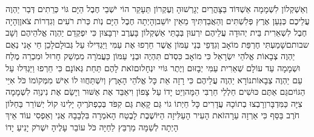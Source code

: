 \documentclass[../main/main.tex]{subfiles}
\begin{document}
\begin{multicols}{\ncols}
וְאַשְׁקְלוֹן לִשְׁמָמָה אַשְׁדּוֹד בַּצָּהֳרַיִם יְגָרְשׁוּהָ וְעֶקְרוֹן תֵּעָקֵר \ClosedSection{}הוֹי יֹשְׁבֵי חֶבֶל הַיָּם גּוֹי כְּרֵתִים דְּבַר יַהְוֶה עֲלֵיכֶם כְּנַעַן אֶרֶץ פְּלִשְׁתִּים וְהַאֲבַדְתִּיךְ מֵאֵין יוֹשֵׁב\PreVerseSpace{}וְהָיְתָה חֶבֶל הַיָּם נְוֺת כְּרֹת רֹעִים וְגִדְרוֹת צֹאן\PreVerseSpace{}וְהָיָה חֶבֶל לִשְׁאֵרִית בֵּית יְהוּדָה עֲלֵיהֶם יִרְעוּן בְּבָתֵּי אַשְׁקְלוֹן בָּעֶרֶב יִרְבָּצוּן כִּי יִפְקְדֵם יַהְוֶה אֱלֹהֵיהֶם וְשָׁב שבותם\PreVerseSpace{}שָׁמַעְתִּי חֶרְפַּת מוֹאָב וְגִדֻּפֵי בְּנֵי עַמּוֹן אֲשֶׁר חֵרְפוּ אֶת עַמִּי וַיַּגְדִּילוּ עַל גְּבוּלָם\PreVerseSpace{}לָכֵן חַי אָנִי נְאֻם יַהְוֶה צְבָאוֹת אֱלֹהֵי יִשְׂרָאֵל כִּי מוֹאָב כִּסְדֹם תִּהְיֶה וּבְנֵי עַמּוֹן כַּעֲמֹרָה מִמְשַׁק חָרוּל וּמִכְרֵה מֶלַח וּשְׁמָמָה עַד עוֹלָם שְׁאֵרִית עַמִּי יְבָזּוּם וְיֶתֶר גּוֹיִי\SubEnd{} יִנְחָלוּם\PreVerseSpace{}זֹאת לָהֶם תַּחַת גְּאוֹנָם כִּי חֵרְפוּ וַיַּגְדִּלוּ עַל עַם יַהְוֶה צְבָאוֹת\PreVerseSpace{}נוֹרָא יַהְוֶה עֲלֵיהֶם כִּי רָזָה אֵת כָּל אֱלֹהֵי הָאָרֶץ וְיִשְׁתַּחֲווּ לוֹ אִישׁ מִמְּקוֹמוֹ כֹּל אִיֵּי הַגּוֹיִם\PreVerseSpace{}גַּם אַתֶּם כּוּשִׁים חַלְלֵי חַרְבִּי הֵמָּה\PreVerseSpace{}וְיֵט יָדוֹ עַל צָפוֹן וִיאַבֵּד אֶת אַשּׁוּר וְיָשֵׂם אֶת נִינְוֵה לִשְׁמָמָה צִיָּה כַּמִּדְבָּר\PreVerseSpace{}וְרָבְצוּ בְתוֹכָהּ עֲדָרִים כָּל חַיְתוֹ גוֹי גַּם קָאַת גַּם קִפֹּד בְּכַפְתֹּרֶיהָ יָלִינוּ קוֹל יְשׁוֹרֵר בַּחַלּוֹן חֹרֶב בַּסַּף כִּי אַרְזָה עֵרָה\PreVerseSpace{}זֹאת הָעִיר הָעַלִּיזָה הַיּוֹשֶׁבֶת לָבֶטַח הָאֹמְרָה בִּלְבָבָהּ אֲנִי וְאַפְסִי עוֹד אֵיךְ הָיְתָה לְשַׁמָּה מַרְבֵּץ לַחַיָּה כֹּל עוֹבֵר עָלֶיהָ יִשְׁרֹק יָנִיעַ יָדוֹ\OpenSection{}\par

\end{multicols}
\end{document}
